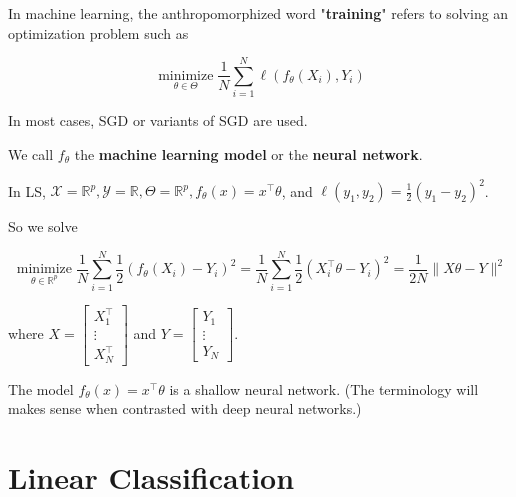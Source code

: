 \documentclass{report}
\begin{document}
\begin{concept}
    In machine learning, the anthropomorphized word "\textbf{training}" refers to solving an optimization problem such as

    $$
    \underset{\theta \in \Theta}{\operatorname{minimize}} \frac{1}{N} \sum_{i=1}^{N} \ell\left(f_{\theta}\left(X_{i}\right), Y_{i}\right)
    $$

    In most cases, SGD or variants of SGD are used.

    We call $f_{\theta}$ the \textbf{machine learning model} or the \textbf{neural network}.
\end{concept}

\begin{example}
    In LS, $\mathcal{X}=\mathbb{R}^{p}, \mathcal{Y}=\mathbb{R}, \Theta=\mathbb{R}^{p}, f_{\theta}(x)=x^{\top} \theta$, and $\ell\left(y_{1}, y_{2}\right)=\frac{1}{2}\left(y_{1}-y_{2}\right)^{2}$.

    So we solve

    $$
    \underset{\theta \in \mathbb{R}^{p}}{\operatorname{minimize}} \frac{1}{N} \sum_{i=1}^{N} \frac{1}{2}\left(f_{\theta}\left(X_{i}\right)-Y_{i}\right)^{2}=\frac{1}{N} \sum_{i=1}^{N} \frac{1}{2}\left(X_{i}^{\top} \theta-Y_{i}\right)^{2}=\frac{1}{2 N}\|X \theta-Y\|^{2}
    $$

    where $X=\left[\begin{array}{c}X_{1}^{\top} \\ \vdots \\ X_{N}^{\top}\end{array}\right]$ and $Y=\left[\begin{array}{c}Y_{1} \\ \vdots \\ Y_{N}\end{array}\right]$.

    The model $f_{\theta}(x)=x^{\top} \theta$ is a shallow neural network. (The terminology will makes sense when contrasted with deep neural networks.)
\end{example}

\section{Linear Classification}
\end{document}
